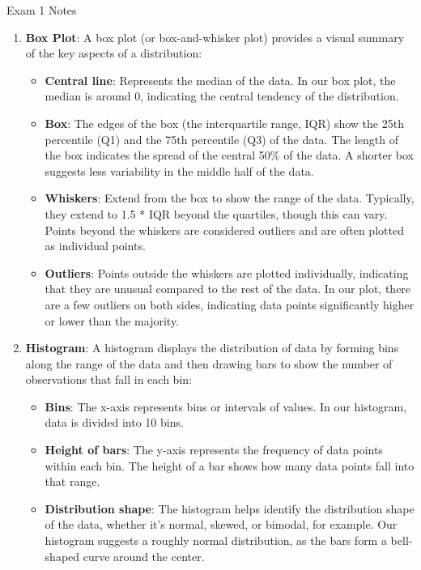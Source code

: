\begin{examnotes}{Exam 1 Notes}
    \begin{enumerate}
        \item \textbf{Box Plot}: A box plot (or box-and-whisker plot) provides a visual summary of the key aspects of a distribution:
        \begin{itemize}
            \item \textbf{Central line}: Represents the median of the data. In our box plot, the median is around 0, indicating the central tendency of the distribution.
            \item \textbf{Box}: The edges of the box (the interquartile range, IQR) show the 25th percentile (Q1) and the 75th percentile (Q3) of the data. The length of the box indicates the spread 
            of the central 50\% of the data. A shorter box suggests less variability in the middle half of the data.
            \item \textbf{Whiskers}: Extend from the box to show the range of the data. Typically, they extend to 1.5 * IQR beyond the quartiles, though this can vary. Points beyond the whiskers are 
            considered outliers and are often plotted as individual points.
            \item \textbf{Outliers}: Points outside the whiskers are plotted individually, indicating that they are unusual compared to the rest of the data. In our plot, there are a few outliers on 
            both sides, indicating data points significantly higher or lower than the majority.
        \end{itemize}
        \item \textbf{Histogram}: A histogram displays the distribution of data by forming bins along the range of the data and then drawing bars to show the number of observations that fall in each bin:
        \begin{itemize}
            \item \textbf{Bins}: The x-axis represents bins or intervals of values. In our histogram, data is divided into 10 bins.
            \item \textbf{Height of bars}: The y-axis represents the frequency of data points within each bin. The height of a bar shows how many data points fall into that range.
            \item \textbf{Distribution shape}: The histogram helps identify the distribution shape of the data, whether it's normal, skewed, or bimodal, for example. Our histogram suggests a roughly 
            normal distribution, as the bars form a bell-shaped curve around the center.

\end{itemize}
\end{enumerate}
\end{examnotes}
